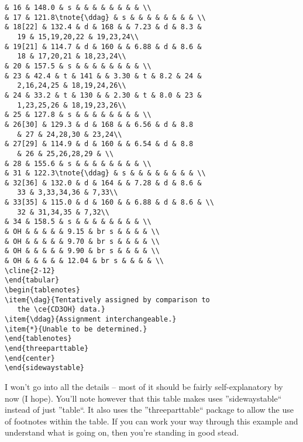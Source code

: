 \begin{verbatim}
& 16 & 148.0 & s & & & & & & & & \\
& 17 & 121.8\tnote{\ddag} & s & & & & & & & & \\
& 18[22] & 132.4 & d & 168 & & 7.23 & d & 8.3 &
   19 & 15,19,20,22 & 19,23,24\\
& 19[21] & 114.7 & d & 160 & & 6.88 & d & 8.6 &
   18 & 17,20,21 & 18,23,24\\
& 20 & 157.5 & s & & & & & & & & \\
& 23 & 42.4 & t & 141 & & 3.30 & t & 8.2 & 24 &
   2,16,24,25 & 18,19,24,26\\
& 24 & 33.2 & t & 130 & & 2.30 & t & 8.0 & 23 &
   1,23,25,26 & 18,19,23,26\\
& 25 & 127.8 & s & & & & & & & & \\
& 26[30] & 129.3 & d & 168 & & 6.56 & d & 8.8
   & 27 & 24,28,30 & 23,24\\
& 27[29] & 114.9 & d & 160 & & 6.54 & d & 8.8
   & 26 & 25,26,28,29 & \\
& 28 & 155.6 & s & & & & & & & & \\
& 31 & 122.3\tnote{\ddag} & s & & & & & & & & \\
& 32[36] & 132.0 & d & 164 & & 7.28 & d & 8.6 &
   33 & 3,33,34,36 & 7,33\\
& 33[35] & 115.0 & d & 160 & & 6.88 & d & 8.6 & \\
   32 & 31,34,35 & 7,32\\
& 34 & 158.5 & s & & & & & & & & \\
& OH & & & & & 9.15 & br s & & & & \\
& OH & & & & & 9.70 & br s & & & & \\
& OH & & & & & 9.90 & br s & & & & \\
& OH & & & & & 12.04 & br s & & & & \\
\cline{2-12}
\end{tabular}
\begin{tablenotes}
\item{\dag}{Tentatively assigned by comparison to
   the \ce{CD3OH} data.}
\item{\ddag}{Assignment interchangeable.}
\item{*}{Unable to be determined.}
\end{tablenotes}
\end{threeparttable}
\end{center}
\end{sidewaystable}
\end{verbatim}

\normalsize\doublespacing
I won't go into all the details -- most of it should be fairly self-explanatory by now (I hope).  You'll note however that this table makes uses ''sidewaystable`` instead of just ''table``.  It also uses the ''threeparttable`` package to allow the use of footnotes within the table.  If you can work your way through this example and understand what is going on, then you're standing in good stead.

